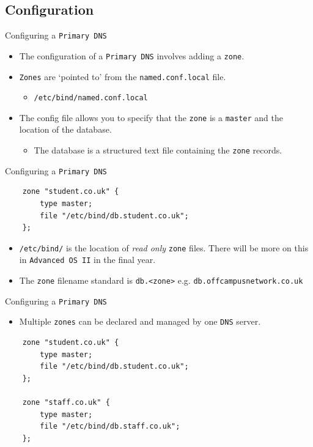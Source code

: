 \documentclass[xcolor=table]{beamer}
\begin{document}
\subsection{Configuration}
\begin{frame}{Configuring a \texttt{Primary DNS}}
  \begin{itemize}
    \item The configuration of a \texttt{Primary DNS} involves adding a \texttt{zone}.
    \item \texttt{Zones} are ‘pointed to’ from the \texttt{named.conf.local} file.
      \begin{itemize}
        \item \texttt{/etc/bind/named.conf.local}
      \end{itemize}
    \item The config file allows you to specify that the \texttt{zone} is a \texttt{master} and the location of the database.
      \begin{itemize}
        \item The database is a structured text file containing the \texttt{zone} records.
      \end{itemize}
  \end{itemize}
\end{frame}

\begin{frame}[fragile]{Configuring a \texttt{Primary DNS}}
  \lstset{
    basicstyle=\small\ttfamily,
  }
  \begin{lstlisting}
    zone "student.co.uk" {
	    type master;
	    file "/etc/bind/db.student.co.uk";
    };
  \end{lstlisting}
  \begin{tcolorbox}[title={\textbf{NOTE:}}]
    \begin{itemize}
      \item \texttt{/etc/bind/} is the location of \textit{read only} \texttt{zone} files. There will be more on this in \texttt{Advanced OS II} in the final year.
      \item The \texttt{zone} filename standard is \texttt{db.<zone>} e.g. \texttt{db.offcampusnetwork.co.uk} 
    \end{itemize}
  \end{tcolorbox}
\end{frame}

\begin{frame}[fragile]{Configuring a \texttt{Primary DNS}}
  \begin{itemize}
    \item Multiple \texttt{zones} can be declared and managed by one \texttt{DNS} server. 
  \end{itemize}
\lstset{
    basicstyle=\small\ttfamily,
  }
  \begin{lstlisting}
    zone "student.co.uk" {
	    type master;
	    file "/etc/bind/db.student.co.uk";
    };

    zone "staff.co.uk" {
	    type master;
	    file "/etc/bind/db.staff.co.uk";
    };
  \end{lstlisting}
\end{frame}
\end{document}
